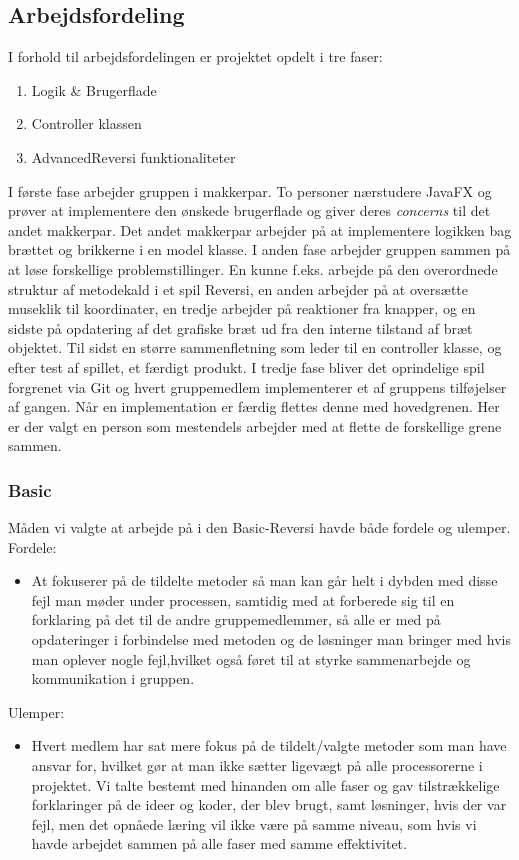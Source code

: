 \subsection{Arbejdsfordeling}
I forhold til arbejdsfordelingen er projektet opdelt i tre faser:
\begin{enumerate}
    \item Logik \& Brugerflade
    \item Controller klassen
    \item AdvancedReversi funktionaliteter
\end{enumerate}
I første fase arbejder gruppen i makkerpar. To personer nærstudere JavaFX og prøver at implementere den ønskede brugerflade og giver deres \emph{concerns} til det andet makkerpar. Det andet makkerpar arbejder på at implementere logikken bag brættet og brikkerne i en model klasse.\newline
I anden fase arbejder gruppen sammen på at løse forskellige problemstillinger. En kunne f.eks. arbejde på den overordnede struktur af metodekald i et spil Reversi, en anden arbejder på at oversætte museklik til koordinater, en tredje arbejder på reaktioner fra knapper, og en sidste på opdatering af det grafiske bræt ud fra den interne tilstand af bræt objektet. Til sidst en større sammenfletning som leder til en controller klasse, og efter test af spillet, et færdigt produkt.
I tredje fase bliver det oprindelige spil forgrenet via Git og hvert gruppemedlem implementerer et af gruppens tilføjelser af gangen. Når en implementation er færdig flettes denne med hovedgrenen. Her er der valgt en person som mestendels arbejder med at flette de forskellige grene sammen.
\subsubsection {Basic}\label{PBS}
Måden vi valgte at arbejde på i den Basic-Reversi havde både fordele og  ulemper.\newline
Fordele: 
\begin{itemize}
\item At fokuserer på de tildelte metoder så man kan går helt i dybden med disse fejl man møder under processen, samtidig med at forberede sig til en forklaring på det til de andre gruppemedlemmer, så alle er med på opdateringer i forbindelse med metoden og de løsninger man bringer med hvis man oplever nogle fejl,hvilket også føret til at styrke sammenarbejde og kommunikation i gruppen.
\end{itemize} 
Ulemper:
\begin{itemize}
\item Hvert medlem har sat mere fokus på de tildelt/valgte metoder som man have ansvar for, hvilket gør at man ikke sætter ligevægt på alle processorerne i projektet. Vi talte bestemt med hinanden om alle faser og gav tilstrækkelige forklaringer på de ideer og koder, der blev brugt, samt løsninger, hvis der var fejl, men det opnåede læring vil ikke være på samme niveau, som hvis vi havde arbejdet sammen på alle faser med samme effektivitet. 
\end{itemize}
